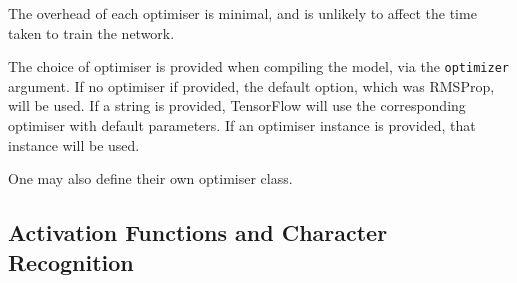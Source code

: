 The overhead of each optimiser is minimal, and is unlikely to affect the time
taken to train the network.

The choice of optimiser is provided when compiling the model, via the
\texttt{optimizer} argument.
If no optimiser if provided, the default option, which was RMSProp, will be
used.
If a string is provided, TensorFlow will use the corresponding optimiser with
default parameters.
If an optimiser instance is provided, that instance will be used.

One may also define their own optimiser class.







\subsection{Activation Functions and Character Recognition}

